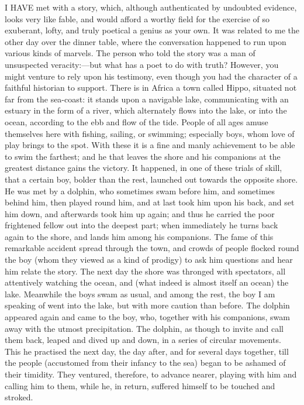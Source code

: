 I HAVE met with a story, which, although authenticated by undoubted
evidence, looks very like fable, and would afford a worthy field for the
exercise of so exuberant, lofty, and truly poetical a genius as your own.
It was related to me the other day over the dinner table, where the
conversation happened to run upon various kinds of marvels. The person who
told the story was a man of unsuspected veracity:—but what has a
poet to do with truth? However, you might venture to rely upon his
testimony, even though you had the character of a faithful historian to
support. There is in Africa a town called Hippo, situated not far from the
sea-coast: it stands upon a navigable lake, communicating with an estuary
in the form of a river, which alternately flows into the lake, or into the
ocean, according to the ebb and flow of the tide. People of all ages amuse
themselves here with fishing, sailing, or swimming; especially boys, whom
love of play brings to the spot. With these it is a fine and manly
achievement to be able to swim the farthest; and he that leaves the shore
and his companions at the greatest distance gains the victory. It
happened, in one of these trials of skill, that a certain boy, bolder than
the rest, launched out towards the opposite shore. He was met by a
dolphin, who sometimes swam before him, and sometimes behind him, then
played round him, and at last took him upon his back, and set him down,
and afterwards took him up again; and thus he carried the poor frightened
fellow out into the deepest part; when immediately he turns back again to
the shore, and lands him among his companions. The fame of this remarkable
accident spread through the town, and crowds of people flocked round the
boy (whom they viewed as a kind of prodigy) to ask him questions and hear
him relate the story. The next day the shore was thronged with spectators,
all attentively watching the ocean, and (what indeed is almost itself an
ocean) the lake. Meanwhile the boys swam as usual, and among the rest, the
boy I am speaking of went into the lake, but with more caution than
before. The dolphin appeared again and came to the boy, who, together with
his companions, swam away with the utmost precipitation. The dolphin, as
though to invite and call them back, leaped and dived up and down, in a
series of circular movements. This he practised the next day, the day
after, and for several days together, till the people (accustomed from
their infancy to the sea) began to be ashamed of their timidity. They
ventured, therefore, to advance nearer, playing with him and calling him
to them, while he, in return, suffered himself to be touched and stroked.
